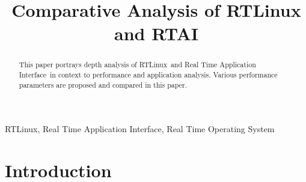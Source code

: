 \documentclass[conference]{IEEEtran}
\newcommand\rtos{Real Time Operating System}
\newcommand\rtai{Real Time Application Interface}
\newcommand\rtlinux{RTLinux}
\begin{document}
%
\title{Comparative Analysis of RTLinux and RTAI 
}

\author{
	\and
}


\maketitle
\IEEEdisplaynontitleabstractindextext
\IEEEpeerreviewmaketitle

\begin{abstract}
	This paper portrays depth analysis of \rtlinux\ and \rtai\ in context to performance and application analysis. Various performance parameters are proposed and compared in this paper.
\end{abstract}

\begin{IEEEkeywords}
	\rtlinux, \rtai, \rtos
\end{IEEEkeywords}

\section{Introduction}


%
%

\end{document}

